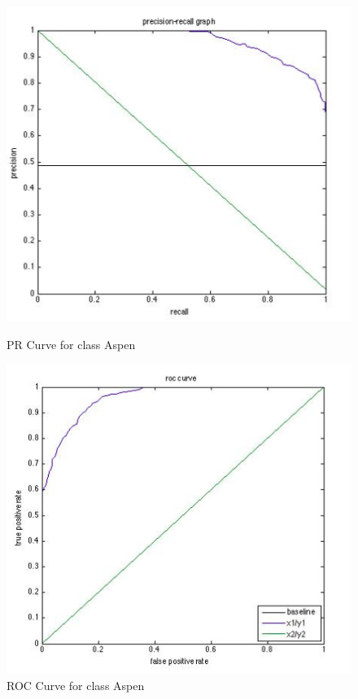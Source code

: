 \documentclass[11pt]{article}
\begin{document}
\begin{figure}[htbp]
\begin{minipage}[b]{0.5\linewidth}
\centering
\includegraphics[width=\linewidth]{AspenPRCurve.png}
\caption{PR Curve for class Aspen}
\label{fig:chapter001_dist_001}
\end{minipage}
\hspace{0.5cm}
\begin{minipage}[b]{0.5\linewidth}
\centering
\includegraphics[width=\linewidth]{AspenROCCurve.png}
\caption{ROC Curve for class Aspen}
\label{fig:chapter001_reward_001}
\end{minipage}
\end{figure}
\end{document}
